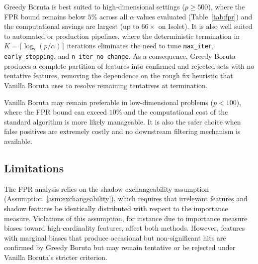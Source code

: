 \documentclass[runningheads]{llncs}
\begin{document}
Greedy Boruta is best suited to high-dimensional settings ($p \geq 500$), where the FPR bound remains below $5\%$ across all $\alpha$ values evaluated (Table~\ref{tab:fpr}) and the computational savings are largest (up to $66\times$ on Isolet). It is also well suited to automated or production pipelines, where the deterministic termination in $K = \lceil \log_2(p/\alpha) \rceil$ iterations eliminates the need to tune \texttt{max\_iter}, \texttt{early\_stopping}, and \texttt{n\_iter\_no\_change}. As a consequence, Greedy Boruta produces a complete partition of features into confirmed and rejected sets with no tentative features, removing the dependence on the rough fix heuristic that Vanilla Boruta uses to resolve remaining tentatives at termination.

Vanilla Boruta may remain preferable in low-dimensional problems ($p < 100$), where the FPR bound can exceed $10\%$ and the computational cost of the standard algorithm is more likely manageable. It is also the safer choice when false positives are extremely costly and no downstream filtering mechanism is available.

\subsection{Limitations}
\label{sec:discussion:limitations}

The FPR analysis relies on the shadow exchangeability assumption (Assumption~\ref{asm:exchangeability}), which requires that irrelevant features and shadow features be identically distributed with respect to the importance measure. 
Violations of this assumption, for instance due to importance measure biases toward high-cardinality features, affect both methods. However, features with marginal biases that produce occasional but non-significant hits are confirmed by Greedy Boruta but may remain tentative or be rejected under Vanilla Boruta's stricter criterion.
\end{document}
